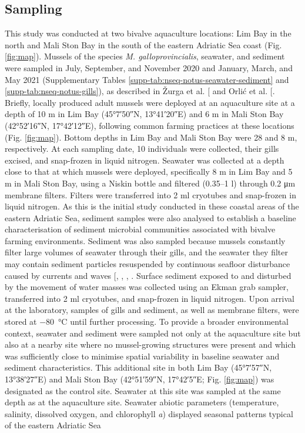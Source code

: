 \documentclass[
  12 pt,
]{article}
\begin{document}
\subsection{Sampling}\label{sampling}

This study was conducted at two bivalve aquaculture locations: Lim Bay in the north and Mali Ston Bay in the south of the eastern Adriatic Sea coast (Fig. \ref{fig:map}). Mussels of the species \emph{M. galloprovincialis}, seawater, and sediment were sampled in July, September, and November 2020 and January, March, and May 2021 (Supplementary Tables \ref{supp-tab:nseq-notus-seawater-sediment} and \ref{supp-tab:nseq-notus-gills}), as described in Žurga et al. {[}\citeproc{ref-Zurga2024}{45}{]} and Orlić et al. {[}\citeproc{ref-Orlic2025a}{46}{]}. Briefly, locally produced adult mussels were deployed at an aquaculture site at a depth of 10 \unit{\m} in Lim Bay (\ang{45;7;50}N, \ang{13;41;20}E) and 6 \unit{\m} in Mali Ston Bay (\ang{42;52;16}N, \ang{17;42;12}E), following common farming practices at these locations (Fig. \ref{fig:map}). Bottom depths in Lim Bay and Mali Ston Bay were 28 and 8 \unit{\m}, respectively. At each sampling date, 10 individuals were collected, their gills excised, and snap-frozen in liquid nitrogen. Seawater was collected at a depth close to that at which mussels were deployed, specifically 8 \unit{\m} in Lim Bay and 5 \unit{\m} in Mali Ston Bay, using a Niskin bottle and filtered (0.35--1 \unit{\l}) through 0.2 \unit{\um} membrane filters. Filters were transferred into 2 \unit{\ml} cryotubes and snap-frozen in liquid nitrogen. As this is the initial study conducted in these coastal areas of the eastern Adriatic Sea, sediment samples were also analysed to establish a baseline characterisation of sediment microbial communities associated with bivalve farming environments. Sediment was also sampled because mussels constantly filter large volumes of seawater through their gills, and the seawater they filter may contain sediment particles resuspended by continuous seafloor disturbance caused by currents and waves {[}, , , \citeproc{ref-Velasco2005}{48}{]}. Surface sediment exposed to and disturbed by the movement of water masses was collected using an Ekman grab sampler, transferred into 2 \unit{\ml} cryotubes, and snap-frozen in liquid nitrogen. Upon arrival at the laboratory, samples of gills and sediment, as well as membrane filters, were stored at \qty{-80}{\degreeCelsius} until further processing. To provide a broader environmental context, seawater and sediment were sampled not only at the aquaculture site but also at a nearby site where no mussel-growing structures were present and which was sufficiently close to minimise spatial variability in baseline seawater and sediment characteristics. This additional site in both Lim Bay (\ang{45;7;57}N, \ang{13;38;27}E) and Mali Ston Bay (\ang{42;51;59}N, \ang{17;42;5}E; Fig. \ref{fig:map}) was designated as the control site. Seawater at this site was sampled at the same depth as at the aquaculture site. Seawater abiotic parameters (temperature, salinity, dissolved oxygen, and chlorophyll \emph{a}) displayed seasonal patterns typical of the eastern Adriatic Sea 
\end{document}
